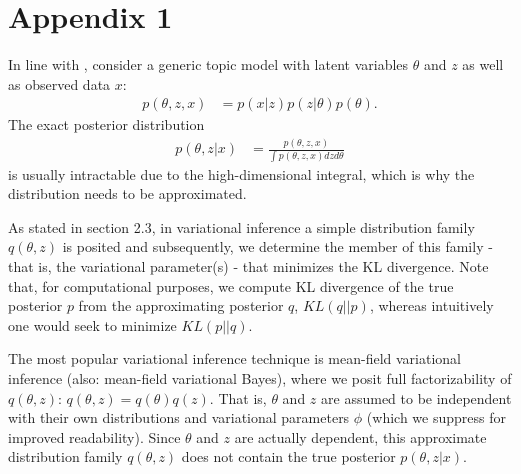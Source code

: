 \section{Appendix 1}

In line with \cite{wang2013variational}, consider a generic topic model with latent variables $\theta$ and $z$ as well as observed data $x$:
\begin{align*}
p(\theta,z,x) &= p(x|z)p(z|\theta)p(\theta).
\end{align*}
The exact posterior distribution
\begin{align*}
p(\theta,z|x) &= \frac{p(\theta,z,x)}{\int p(\theta,z,x)dzd\theta}
\end{align*}
is usually intractable due to the high-dimensional integral, which is why the distribution needs to be approximated.

As stated in section 2.3, in variational inference a simple distribution family $q(\theta,z)$ is posited and subsequently, we determine the member of this family - that is, the variational parameter(s) - that minimizes the KL divergence. Note that, for computational purposes, we compute KL divergence of the true posterior $p$ from the approximating posterior $q$, $KL(q||p)$, whereas intuitively one would seek to minimize $KL(p||q)$.

The most popular variational inference technique is mean-field variational inference (also: mean-field variational Bayes), where we posit full factorizability of $q(\theta,z)$: $q(\theta,z) = q(\theta)q(z)$. That is, $\theta$ and $z$ are assumed to be independent with their own distributions and variational parameters $\phi$ (which we suppress for improved readability). Since $\theta$ and $z$ are actually dependent, this approximate distribution family $q(\theta,z)$ does not contain the true posterior $p(\theta,z|x)$.  


